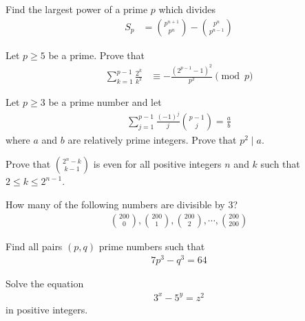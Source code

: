 \begin{problem} %
	Find the largest power of a prime $p$ which divides
	\begin{align*}
		S_p
			& =\binom{p^{n+1}}{p^n}-\binom{p^{n}}{p^{n-1}}
	\end{align*}
\end{problem}

\begin{problem} %
	Let $p \geq 5$ be a prime. Prove that
		\begin{align*}
			\sum_{k=1}^{p-1}\frac{2^k}{k^2}
				& \equiv-\frac{(2^{p-1}-1)^2}{p^2}\pmod p
		\end{align*}
\end{problem}

\begin{problem} %
	Let $p\geq 3$ be a prime number and let
		\begin{align*}
			\sum_{j=1}^{p-1}\frac{(-1)^{j}}{j} \binom{p-1}{j} =\frac{a}{b}
		\end{align*}
	where $a$ and $b$ are relatively prime integers. Prove that $p^2\mid a$.
\end{problem}

\begin{problem} %
	Prove that $\binom{2^{n}-k}{k-1}$ is even for all positive integers $n$ and $k$ such that $2\le k\le 2^{n-1}$.
\end{problem}

\begin{problem} %
	How many of the following numbers are divisible by $3$?
	\begin{align*}
	\binom{200}{0}, \binom{200}{1}, \binom{200}{2}, \cdots, \binom{200}{200}
	\end{align*}
\end{problem}


\begin{problem} %
	Find all pairs $(p,q)$ prime numbers such that
		\begin{align*}
			7 p^3 - q^3 = 64
		\end{align*}
\end{problem}

\begin{problem}[BMO 2009] %
	Solve the equation
		\begin{align*}
			3^x - 5^y = z^2
		\end{align*}
	in positive integers.
\end{problem}

